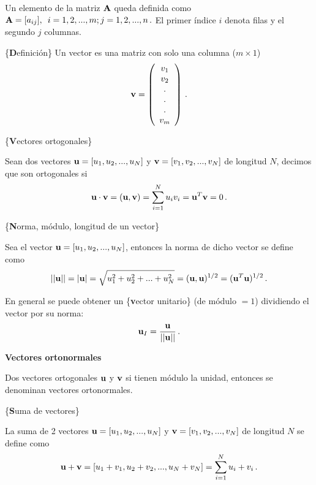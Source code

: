 \documentclass[
]{agujournal2019}
\begin{document}
Un elemento de la matriz \({\textbf A}\) queda definida como
\({\textbf A}=[a_{ij}],\,\,\,i=1,2,...,m; j=1,2,...,n\,.\) El primer
índice \(i\) denota filas y el segundo \(j\) columnas.

\vspace{0.5cm}

\{\noindent \textbf Definición\} Un vector es una matriz con solo una
columna (\(m\times1\)) \[{\textbf v}=\left( \begin{array}{c}
 v_1 \\ v_2 \\ . \\ . \\ . \\ v_m
       \end{array} \right)
       \,.\]

\vspace{0.5cm}

\{\noindent \textbf Vectores ortogonales\}

Sean dos vectores \({\textbf u}=[u_1,u_2,...,u_N]\) y
\({\textbf v}=[v_1,v_2,...,v_N]\) de longitud \(N\), decimos que son
ortogonales si
\[{\textbf u}\cdot{\textbf v}=({\textbf u},{\textbf v})=\sum\limits^N_{i=1} u_i v_i={\textbf u}^T{\textbf v}=0\,.\]

\vspace{0.5cm}

\{\noindent \textbf Norma, módulo, longitud de un vector\}

Sea el vector \({\textbf u}=[u_1,u_2,...,u_N]\), entonces la norma de
dicho vector se define como
\[||{\textbf u}||=|{\textbf u}|=\sqrt{u^2_1 + u^2_2 + ... + u^2_N}=({\textbf u},{\textbf u})^{1/2}=({\textbf u}^T{\textbf u})^{1/2}\,.\]

En general se puede obtener un \{\textbf vector unitario\} (de módulo
\(=1\)) dividiendo el vector por su norma:
\[{\textbf u}_I=\frac{{\textbf u}}{||{\textbf u}||}\,.\]

\vspace{0.5cm}

\textbf{Vectores ortonormales}

Dos vectores ortogonales \({\textbf u}\) y \({\textbf v}\) si tienen
módulo la unidad, entonces se denominan vectores ortonormales.

\vspace{0.5cm}

\{\noindent \textbf Suma de vectores\}

La suma de 2 vectores \({\textbf u}=[u_1,u_2,...,u_N]\) y
\({\textbf v}=[v_1,v_2,...,v_N]\) de longitud \(N\) se define como
\[{\textbf u} + {\textbf v}= [u_1 + v_1, u_2 + v_2,..., u_N + v_N]=\sum\limits^N_{i=1} u_i + v_i\,.\]
\end{document}
